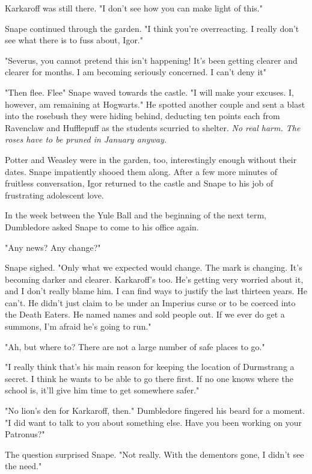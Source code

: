 Karkaroff was still there. "I don't see how you can make light of this."

Snape continued through the garden. "I think you're overreacting. I really don't see what there is to fuss about, Igor."

"Severus, you cannot pretend this isn't happening! It's been getting clearer and clearer for months. I am becoming seriously concerned. I can't deny it{\el}"

"Then flee. Flee{\el}" Snape waved towards the castle. "I will make your excuses. I, however, am remaining at Hogwarts." He spotted another couple and sent a blast into the rosebush they were hiding behind, deducting ten points each from Ravenclaw and Hufflepuff as the students scurried to shelter. \emph{No real harm. The roses have to be pruned in January anyway.}

Potter and Weasley were in the garden, too, interestingly enough without their dates. Snape impatiently shooed them along. After a few more minutes of fruitless conversation, Igor returned to the castle and Snape to his job of frustrating adolescent love.

In the week between the Yule Ball and the beginning of the next term, Dumbledore asked Snape to come to his office again.

"Any news? Any change?"

Snape sighed. "Only what we expected would change. The mark is changing. It's becoming darker and clearer. Karkaroff's too. He's getting very worried about it, and I don't really blame him. I can find ways to justify the last thirteen years. He can't. He didn't just claim to be under an Imperius curse or to be coerced into the Death Eaters. He named names and sold people out. If we ever do get a summons, I'm afraid he's going to run."

"Ah, but where to? There are not a large number of safe places to go."

"I really think that's his main reason for keeping the location of Durmstrang a secret. I think he wants to be able to go there first. If no one knows where the school is, it'll give him time to get somewhere safer."

"No lion's den for Karkaroff, then." Dumbledore fingered his beard for a moment. "I did want to talk to you about something else. Have you been working on your Patronus?"

The question surprised Snape. "Not really. With the dementors gone, I didn't see the need."

